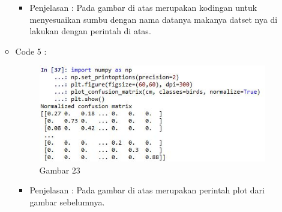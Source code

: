 \begin{enumerate}
\begin{itemize}
\par
\begin{itemize}
\item Penjelasan : Pada gambar di atas merupakan kodingan untuk menyesuaikan sumbu dengan nama datanya makanya datset nya di lakukan dengan perintah di atas.
\par
\par
\par
\end{itemize}
\item Code 5 :
\par
\begin{figure}[ht]
\centering
\includegraphics[scale=0.7]{figures/pd23.jpeg}
\caption{Gambar 23}
\label{contoh}
\end{figure}
\par
\begin{itemize}
\item Penjelasan : Pada gambar di atas merupakan perintah plot dari gambar sebelumnya.
\par
\par
\par
\end{itemize}

\end{itemize}


\end{enumerate}
